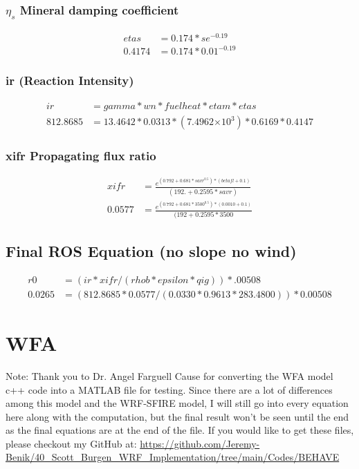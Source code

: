 \documentclass{article}
\newcommand\tenpow[1]{\ensuremath{{\times}10^{#1}}}
\begin{document}
\subsubsection*{$\eta_s$ Mineral damping coefficient}
\begin{equation}
	\begin{split}
		etas &= 0.174 * se^{-0.19} \\
		0.4174 &= 0.174 * 0.01 ^ {-0.19}
	\end{split}
\end{equation}

\subsubsection*{ir (Reaction Intensity)}
\begin{equation}
	\begin{split}
		ir       &= gamma * wn * fuelheat * etam * etas \\
		812.8685 &= 13.4642 * 0.0313 * (7.4962 \tenpow{3}) * 0.6169 * 0.4147
	\end{split}
\end{equation}
\subsubsection*{xifr Propagating flux ratio}
\begin{equation}
	\begin{split}
		xifr     &= \frac{e^ {(0.792 + 0.681*savr^0.5) * (betafl+0.1)}} {(192. + 0.2595*savr)} \\
		0.0577 &= \frac{e^{(0.792 + 0.681 * 3500^{0.5}) * (0.0010 + 0.1)}} {(192 + 0.2595 * 3500}
	\end{split}
\end{equation}

\subsection{Final ROS Equation (no slope no wind)}
\begin{equation}
	\begin{split}
		r0 &= (ir*xifr/(rhob * epsilon *qig)) * .00508 \\
		0.0265 &= (812.8685 * 0.0577 / (0.0330 * 0.9613 * 283.4800)) * 0.00508
	\end{split}
\end{equation}


\section{WFA}
Note: Thank you to Dr. Angel Farguell Cause for converting the WFA model c++ code into a MATLAB file for testing. 
Since there are a lot of differences among this model and the WRF-SFIRE model, I will still go into every equation here along with the computation, but the final result won't be seen until the end as the final equations are at the end of the file. If you would like to get these files, please checkout my GitHub at: \url{https://github.com/Jeremy-Benik/40_Scott_Burgen_WRF_Implementation/tree/main/Codes/BEHAVE}
\end{document}
